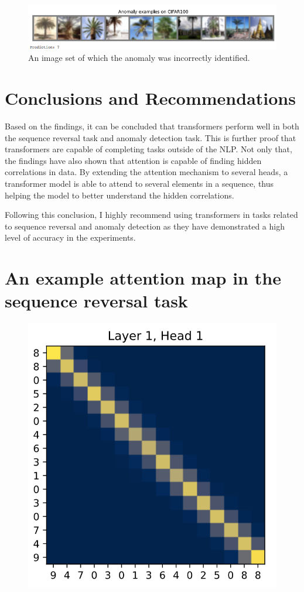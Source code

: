 \documentclass[peerreview]{IEEEtran}
\begin{document}
\begin{figure}[!h]
\centering
\includegraphics[width=1\columnwidth]{anomaly_incorrect} 
\caption{An image set of which the anomaly was incorrectly identified.}
\label{anomaly_incorrect}
\end{figure}


\section{Conclusions and Recommendations}
Based on the findings, it can be concluded that transformers perform well in both the sequence reversal task and anomaly detection task. This is further proof that transformers are capable of completing tasks outside of the NLP. Not only that, the findings have also shown that attention is capable of finding hidden correlations in data. By extending the attention mechanism to several heads, a transformer model is able to attend to several elements in a sequence, thus helping the model to better understand the hidden correlations.

Following this conclusion, I highly recommend using transformers in tasks related to sequence reversal and anomaly detection as they have demonstrated a high level of accuracy in the experiments.

\newpage
\appendices
\section{An example attention map in the sequence reversal task} \label{App:reversal_attention_map}
\begin{figure}[!h]
\centering
\includegraphics[width=0.8\columnwidth]{reversal_attention_map} 
\end{figure}
\end{document}
